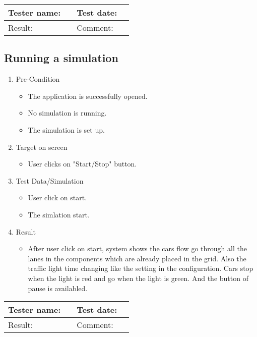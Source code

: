 \begin{tabularx}{\textwidth}{|p{3cm}X|p{3cm}X|}\hline
	Tester name: &  & Test date: & \\\hline
	Result: &   \pass & Comment: & \\\hline
\end{tabularx}

\newpage 

\subsection{Running a simulation}

\begin{enumerate}
	\item Pre-Condition
	\begin{itemize}
		\item The application is successfully opened.
		\item No simulation is running.
		\item The simulation is set up.
	\end{itemize}
	\item Target on screen
	\begin{itemize}
		\item User clicks on "Start/Stop" button.
	\end{itemize}
	\item Test Data/Simulation
	\begin{itemize}
		\item User click on start.
		\item The simlation start.
	\end{itemize}
	\item Result
	\begin{itemize}
		\item After user click on start, system shows the cars flow go through all the lanes in the components which are already placed in the grid. Also the traffic light time changing like the setting in the configuration. 
		Cars stop when the light is red and go when the light is green. And the button of pause is availabled.
	\end{itemize}
\end{enumerate}

\begin{tabularx}{\textwidth}{|p{3cm}X|p{3cm}X|}\hline
	Tester name: &  & Test date: & \\\hline
	Result: &   \pass & Comment: & \\\hline
\end{tabularx}

